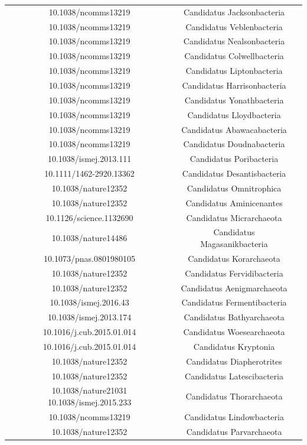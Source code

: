\documentclass[12pt, a4paper]{report}
\begin{document}
\begin{center}
\begin{longtable}{ccc}
10.1038/ncomms13219	&	Candidatus Jacksonbacteria 	\\
10.1038/ncomms13219	&	Candidatus Veblenbacteria	\\
10.1038/ncomms13219	&	Candidatus Nealsonbacteria 	\\
10.1038/ncomms13219	&	Candidatus Colwellbacteria 	\\
10.1038/ncomms13219	&	Candidatus Liptonbacteria 	\\
10.1038/ncomms13219	&	Candidatus Harrisonbacteria 	\\
10.1038/ncomms13219	&	Candidatus Yonathbacteria 	\\
10.1038/ncomms13219	&	Candidatus Lloydbacteria	\\
10.1038/ncomms13219	&	Candidatus Abawacabacteria	\\
10.1038/ncomms13219	&	Candidatus Doudnabacteria	\\
10.1038/ismej.2013.111	&	Candidatus Poribacteria	\\
10.1111/1462-2920.13362	&	Candidatus Desantisbacteria	\\
10.1038/nature12352	&	Candidatus Omnitrophica	\\
10.1038/nature12352	&	Candidatus Aminicenantes	\\
10.1126/science.1132690	&	Candidatus Micrarchaeota	\\
10.1038/nature14486	&	Candidatus Magasanikbacteria	\\
10.1073/pnas.0801980105	&	Candidatus Korarchaeota	\\
10.1038/nature12352	&	Candidatus Fervidibacteria	\\
10.1038/nature12352	&	Candidatus Aenigmarchaeota	\\
10.1038/ismej.2016.43	&	Candidatus Fermentibacteria	\\
10.1038/ismej.2013.174	&	Candidatus Bathyarchaeota	\\
10.1016/j.cub.2015.01.014	&	Candidatus Woesearchaeota	\\
10.1016/j.cub.2015.01.014	&	Candidatus Kryptonia	\\
10.1038/nature12352	&	Candidatus Diapherotrites	\\
10.1038/nature12352	&	Candidatus Latescibacteria	\\
10.1038/nature21031 10.1038/ismej.2015.233	&	Candidatus Thorarchaeota	\\
10.1038/ncomms13219	&	Candidatus Lindowbacteria	\\
10.1038/nature12352	&	Candidatus Parvarchaeota	\\

\end{longtable}
\end{center}
\end{document}
